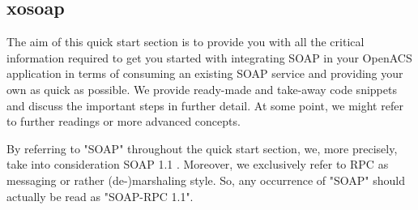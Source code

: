  \subsection{xosoap}\label{sec:quickstart:xosoap}
  The aim of this quick start section is to provide you with all the critical information required to get you 
started with integrating SOAP in your OpenACS application in terms of consuming an existing SOAP 
service and providing your own as quick as possible. We provide ready-made and take-away code 
snippets and discuss the important steps in further detail. At some point, we might refer to further 
readings or more advanced concepts. 
\begin{hints}
\item By referring to "SOAP" throughout the quick start section, we, more precisely, take into consideration SOAP 1.1 \cite{w3c:2000}. Moreover, we exclusively refer to RPC as messaging or rather (de-)marshaling style. So, any occurrence of "SOAP" should actually be read as "SOAP-RPC 1.1".
\end{hints}

